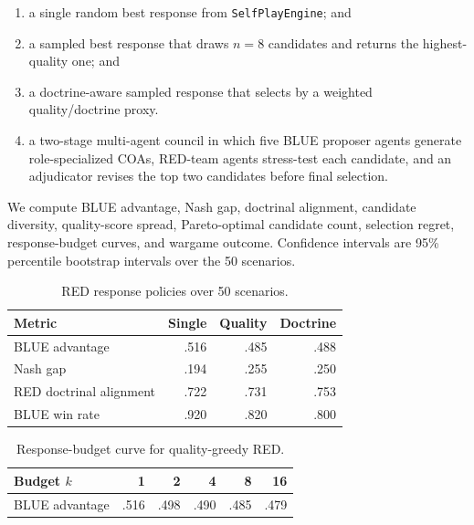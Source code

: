 \documentclass[sigconf]{acmart}
\begin{document}
\begin{enumerate}
  \item a single random best response from \texttt{SelfPlayEngine}; and
  \item a sampled best response that draws $n=8$ candidates and returns the highest-quality one; and
  \item a doctrine-aware sampled response that selects by a weighted quality/doctrine proxy.
  \item a two-stage multi-agent council in which five BLUE proposer agents generate role-specialized COAs, RED-team agents stress-test each candidate, and an adjudicator revises the top two candidates before final selection.
\end{enumerate}

We compute BLUE advantage, Nash gap, doctrinal alignment, candidate diversity, quality-score spread, Pareto-optimal candidate count, selection regret, response-budget curves, and wargame outcome. Confidence intervals are 95\% percentile bootstrap intervals over the 50 scenarios.

\begin{table}[t]
\caption{RED response policies over 50 scenarios.}
\label{tab:main}
\small
\begin{tabular}{lrrr}
\toprule
Metric & Single & Quality & Doctrine \\
\midrule
BLUE advantage & .516 & .485 & .488 \\
Nash gap & .194 & .255 & .250 \\
RED doctrinal alignment & .722 & .731 & .753 \\
BLUE win rate & .920 & .820 & .800 \\
\bottomrule
\end{tabular}
\end{table}

\begin{table}[t]
\caption{Response-budget curve for quality-greedy RED.}
\label{tab:budget}
\small
\begin{tabular}{lrrrrr}
\toprule
Budget $k$ & 1 & 2 & 4 & 8 & 16 \\
\midrule
BLUE advantage & .516 & .498 & .490 & .485 & .479 \\
\bottomrule
\end{tabular}
\end{table}
\end{document}
